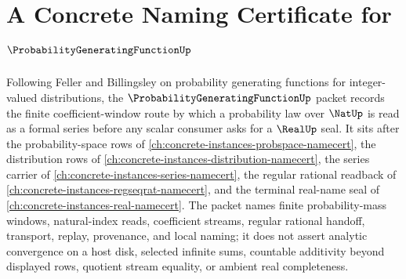 \chapter{A Concrete Naming Certificate for $\ProbabilityGeneratingFunctionUp$}
\label{ch:concrete-instances-probability-generating-function-namecert}

Following Feller and Billingsley on probability generating functions for integer-valued distributions, the $\ProbabilityGeneratingFunctionUp$ packet records the finite coefficient-window route by which a probability law over $\NatUp$ is read as a formal series before any scalar consumer asks for a $\RealUp$ seal. It sits after the probability-space rows of \autoref{ch:concrete-instances-probspace-namecert}, the distribution rows of \autoref{ch:concrete-instances-distribution-namecert}, the series carrier of \autoref{ch:concrete-instances-series-namecert}, the regular rational readback of \autoref{ch:concrete-instances-regseqrat-namecert}, and the terminal real-name seal of \autoref{ch:concrete-instances-real-namecert}. The packet names finite probability-mass windows, natural-index reads, coefficient streams, regular rational handoff, transport, replay, provenance, and local naming; it does not assert analytic convergence on a host disk, selected infinite sums, countable additivity beyond displayed rows, quotient stream equality, or ambient real completeness.

